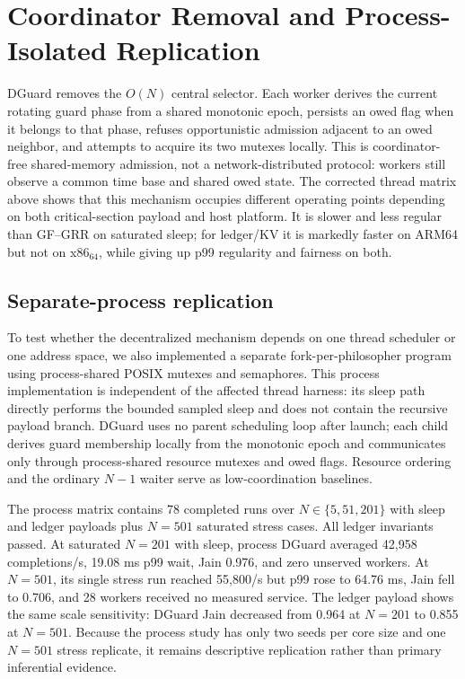\documentclass[10pt,journal]{IEEEtran}
\begin{document}
\section{Coordinator Removal and Process-Isolated Replication}
DGuard removes the $O(N)$ central selector. Each worker derives the current rotating guard phase from a shared monotonic epoch, persists an owed flag when it belongs to that phase, refuses opportunistic admission adjacent to an owed neighbor, and attempts to acquire its two mutexes locally. This is coordinator-free shared-memory admission, not a network-distributed protocol: workers still observe a common time base and shared owed state. The corrected thread matrix above shows that this mechanism occupies different operating points depending on both critical-section payload and host platform. It is slower and less regular than GF--GRR on saturated sleep; for ledger/KV it is markedly faster on ARM64 but not on x86$_{64}$, while giving up p99 regularity and fairness on both.

\subsection{Separate-process replication}
To test whether the decentralized mechanism depends on one thread scheduler or one address space, we also implemented a separate fork-per-philosopher program using process-shared POSIX mutexes and semaphores. This process implementation is independent of the affected thread harness: its sleep path directly performs the bounded sampled sleep and does not contain the recursive payload branch. DGuard uses no parent scheduling loop after launch; each child derives guard membership locally from the monotonic epoch and communicates only through process-shared resource mutexes and owed flags. Resource ordering and the ordinary $N-1$ waiter serve as low-coordination baselines.

The process matrix contains 78 completed runs over $N\in\{5,51,201\}$ with sleep and ledger payloads plus $N=501$ saturated stress cases. All ledger invariants passed. At saturated $N=201$ with sleep, process DGuard averaged 42,958 completions/s, 19.08 ms p99 wait, Jain 0.976, and zero unserved workers. At $N=501$, its single stress run reached 55,800/s but p99 rose to 64.76 ms, Jain fell to 0.706, and 28 workers received no measured service. The ledger payload shows the same scale sensitivity: DGuard Jain decreased from 0.964 at $N=201$ to 0.855 at $N=501$. Because the process study has only two seeds per core size and one $N=501$ stress replicate, it remains descriptive replication rather than primary inferential evidence.
\end{document}
